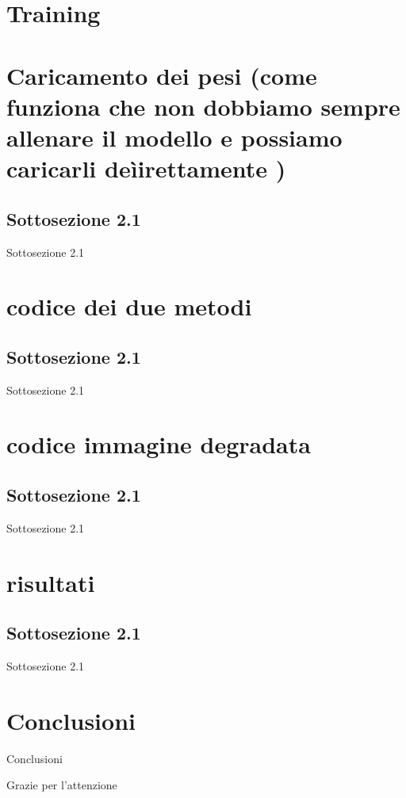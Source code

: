 \documentclass[11pt]{beamer}
\begin{document}
\section{Training} %


\section{Caricamento dei pesi (come funziona che non dobbiamo sempre allenare il modello e possiamo caricarli deìirettamente )} 
\subsection{Sottosezione 2.1}
\begin{frame}{Sottosezione 2.1}
\end{frame}

\section{codice dei due metodi} 
\subsection{Sottosezione 2.1}
\begin{frame}{Sottosezione 2.1}
\end{frame}

\section{codice immagine degradata} 
\subsection{Sottosezione 2.1}
\begin{frame}{Sottosezione 2.1}
\end{frame}

\section{risultati} 
\subsection{Sottosezione 2.1}
\begin{frame}{Sottosezione 2.1}
\end{frame}

\section{Conclusioni}
\begin{frame}{Conclusioni}
\end{frame}

\begin{frame}
  \centering
  {\Huge Grazie per l'attenzione}
\end{frame}
\end{document}

